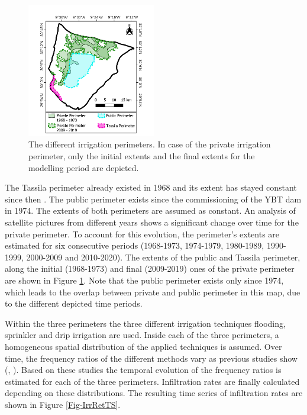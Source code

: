 \begin{figure}
    \vspace{-24pt}
    \centering
    \includegraphics[width=0.5\textwidth]{./img/Map_IrrigationPerimeters.pdf}
    \vspace{-18pt}
    \captionsetup{format=plain, textfont=it, labelfont=bf}
    \caption{The different irrigation perimeters. In case of the private irrigation perimeter, only the initial extents and the final extents for the modelling period are depicted.}
    \vspace{-12pt}
    \label{Map-IrrigationPerimeters}
\end{figure}

The Tassila perimeter already existed in 1968 and its extent has stayed constant since then \textcite{Bernet.1977}.
The public perimeter exists since the commissioning of the YBT dam in 1974. 
The extents of both perimeters are assumed as constant. 
An analysis of satellite pictures from different years shows a significant change over time for the private perimeter. 
To account for this evolution, the perimeter's extents are estimated for six consecutive periods (1968-1973, 1974-1979, 1980-1989, 1990-1999, 2000-2009 and 2010-2020). 
The extents of the public and Tassila perimeter, along the initial (1968-1973) and final (2009-2019) ones of the private perimeter are shown in Figure \ref{Map-IrrigationPerimeters}. 
Note that the public perimeter exists only since 1974, which leads to the overlap between private and public perimeter in this map, due to the different depicted time periods.

Within the three perimeters the three different irrigation techniques flooding, sprinkler and drip irrigation are used. 
Inside each of the three perimeters, a homogeneous spatial distribution of the applied techniques is assumed. 
Over time, the frequency ratios of the different methods vary as previous studies show (\cite{Resing.2003}, \cite{Anzar.2016}). 
Based on these studies the temporal evolution of the frequency ratios is estimated for each of the three perimeters. 
Infiltration rates are finally calculated depending on these distributions. 
The resulting time series of infiltration rates are shown in Figure \ref{Fig-IrrRetTS}.


